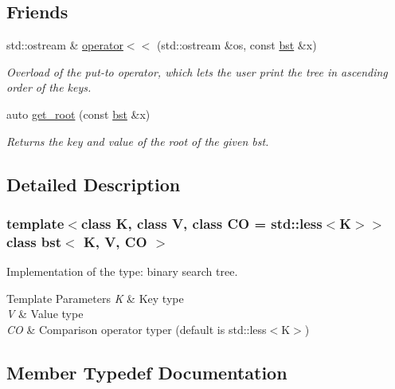 \subsection*{Friends}
\begin{DoxyCompactItemize}
\item 
std\+::ostream \& \hyperlink{classbst_ae4b7d69364fca0855f74abdcad674ebf}{operator$<$$<$} (std\+::ostream \&os, const \hyperlink{classbst}{bst} \&x)
\begin{DoxyCompactList}\small\item\em Overload of the put-\/to operator, which lets the user print the tree in ascending order of the keys. \end{DoxyCompactList}\item 
auto \hyperlink{classbst_aecb3dc60f765eb28a88e75c966a76336}{get\+\_\+root} (const \hyperlink{classbst}{bst} \&x)
\begin{DoxyCompactList}\small\item\em Returns the key and value of the root of the given bst. \end{DoxyCompactList}\end{DoxyCompactItemize}


\subsection{Detailed Description}
\subsubsection*{template$<$class K, class V, class CO = std\+::less$<$\+K$>$$>$\newline
class bst$<$ K, V, C\+O $>$}

Implementation of the type\+: binary search tree. 


\begin{DoxyTemplParams}{Template Parameters}
{\em K} & Key type \\
\hline
{\em V} & Value type \\
\hline
{\em CO} & Comparison operator typer (default is std\+::less$<$\+K$>$) \\
\hline
\end{DoxyTemplParams}


\subsection{Member Typedef Documentation}
\mbox{\label{classbst_a9378fa7f3f48ee62f3a0b4d168d8d98b}} 
